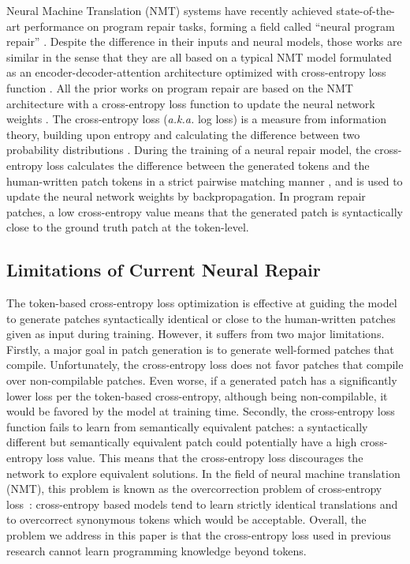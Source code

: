 Neural Machine Translation (NMT) systems have recently achieved  state-of-the-art performance on program repair tasks, forming a field called ``neural program repair'' \cite{SEQUENCER,CoCoNuT,codit-tse20,Tufano-ICSE19,deepfix,Tufano-tse19, Recoder,CURE-icse21}.
Despite the difference in their inputs and neural models, those works are  similar in the sense that they are all based on
a typical NMT model formulated as an encoder-decoder-attention architecture optimized with cross-entropy loss function \cite{nmt,attention-all-you-need,Vaswani2021Transformer,NMT-bridging,overcorrection}. 
All the prior works on program repair are based on the NMT architecture with a cross-entropy loss function to update the neural network weights \cite{SEQUENCER,CoCoNuT,codit-tse20,Tufano-ICSE19,deepfix,Tufano-tse19, Recoder,CURE-icse21}. 
The cross-entropy loss (\textit{a.k.a.} log loss) is a measure from information theory, building upon entropy and calculating the difference between two probability distributions \cite{nmt,aligncrossentropy}. During the training of a neural repair model, the cross-entropy loss calculates the difference between the generated tokens and the human-written patch  tokens in a strict pairwise matching manner \cite{nmt,NMT-bridging,overcorrection},
and is used to update the neural network weights by backpropagation. 
In program repair patches, a low cross-entropy value  means that the generated patch is syntactically close to the ground truth patch at the token-level. 

\subsection{Limitations of Current Neural Repair}
\label{sec:background:problems}

The token-based cross-entropy loss optimization is effective at guiding the model to generate patches syntactically identical or close to the human-written patches given as input during training.
However, it suffers from two major limitations.
Firstly, a major goal in patch generation is to generate well-formed patches that compile. 
Unfortunately, the cross-entropy loss does not favor patches that compile over non-compilable patches.
Even worse, if a generated patch has a significantly lower loss per the token-based cross-entropy, although being non-compilable, it would be favored by the model at training time.
Secondly, the cross-entropy loss function fails to learn from semantically equivalent patches: a syntactically different but semantically equivalent patch could potentially have a high cross-entropy loss value. 
This means that the cross-entropy loss 
discourages the network to explore equivalent solutions. 
In the field of neural machine translation (NMT), this problem is known as the overcorrection problem of cross-entropy loss~\cite{NMT-bridging,overcorrection}: cross-entropy based models tend to learn strictly identical translations and to overcorrect synonymous tokens which would be acceptable.
Overall, the problem we address in this paper is that the cross-entropy loss used in previous research cannot learn programming knowledge beyond tokens. 

